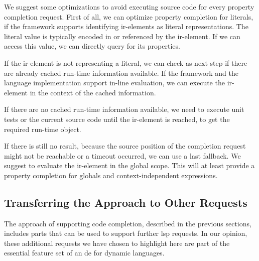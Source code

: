 \documentclass[sigplan,10pt,review,anonymous]{acmart}
\begin{document}
    We suggest some optimizations to avoid executing source code for every property completion request. First of all, we can optimize property completion for literals, if the framework supports identifying \ac{ir}-elements as literal representations. The literal value is typically encoded in or referenced by the \ac{ir}-element. If we can access this value, we can directly query for its properties.
    
    If the \ac{ir}-element is not representing a literal, we can check as next step if there are already cached run-time information available. If the framework and the language implementation support in-line evaluation, we can execute the \ac{ir}-element in the context of the cached information.

    If there are no cached run-time information available, we need to execute unit tests or the current source code until the \ac{ir}-element is reached, to get the required run-time object.

    If there is still no result, because the source position of the completion request might not be reachable or a timeout occurred, we can use a last fallback. We suggest to evaluate the \ac{ir}-element in the global scope. This will at least provide a property completion for globals and context-independent expressions.

\subsection{Transferring the Approach to Other Requests}
\label{sec:appr:transferringApproachToOtherRequests}
The approach of supporting code completion, described in the previous sections,
includes parts that can be used to support further \ac{lsp} requests. In our
opinion, these additional requests we have chosen to highlight here are part of
the essential feature set of an \ac{de} for dynamic languages.
\end{document}
